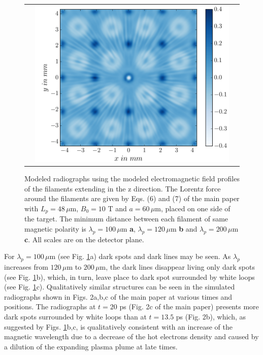 \documentclass[aps,showpacs,superscriptaddress]{revtex4}
\begin{document}
\begin{figure}[ht]
{\begin{tabular}{ccc}
&\includegraphics[scale=0.15]{p_radio_conv_2D5_Alu_10T_a60_l280.png}
\end{tabular}}
\caption{\label{fig:radiosup}  
Modeled radiographs using the modeled electromagnetic field profiles of the filaments extending in the z direction.
The Lorentz force around the  filaments  are given by Eqs. (6) and (7) of the main paper with $L_p = 48 \, \mu$m, $B_0= 10$ T and $a = 60\, \mu$m, placed on one side of the target.
The minimum distance between each filament of same magnetic polarity is $ \lambda_p =100\, \mu$m  \textbf{a}, $ \lambda_p =120\, \mu$m \textbf{b} and $ \lambda_p =200\, \mu$m   \textbf{c}.
All scales are on the detector plane.
}
\end{figure}
For  $ \lambda_p =100\, \mu$m (see Fig. \ref{fig:radiosup}a)  dark spots and dark lines  may be seen. As  $ \lambda_p$ increases from $120\, \mu$m  to   $ 200\, \mu$m, the dark lines disappear living only dark spots (see Fig. \ref{fig:radiosup}b), which, in turn, leave place to dark spot surrounded by white loops (see Fig. \ref{fig:radiosup}c). Qualitatively similar structures can be seen in the simulated radiographs shown in Figs. 2a,b,c of the main paper at various times and positions. 
The radiographs at $t =20$ ps  (Fig. 2c of the main paper) presents more dark spots surrounded by white loops than at $t= 13.5$ ps  (Fig. 2b),  which, as suggested by Figs. \ref{fig:radiosup}b,c, is qualitatively consistent with an increase of the magnetic wavelength due to a decrease of the hot electrons density and caused by a dilution of the expanding plasma plume at late times.
\end{document}
